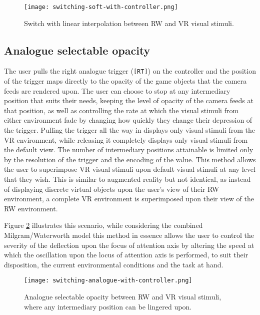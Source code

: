 \begin{figure}[h]
	\begin{center}
		\texttt{[image: switching-soft-with-controller.png]}
		\caption{Switch with linear interpolation between RW and VR visual stimuli.}
		\label{scenario12}
	\end{center}
\end{figure}


\subsection{Analogue selectable opacity}
\label{analogue-selectable-opacity}
The user pulls the right analogue trigger (\texttt{[RT]}) on the controller and the position of the trigger maps directly to the opacity of the game objects that the camera feeds are rendered upon. The user can choose to stop at any intermediary position that suits their needs, keeping the level of opacity of the camera feeds at that position, as well as controlling the rate at which the visual stimuli from either environment fade by changing how quickly they change their depression of the trigger. Pulling the trigger all the way in displays only visual stimuli from the VR environment, while releasing it completely displays only visual stimuli from the default view. The number of intermediary positions attainable is limited only by the resolution of the trigger and the encoding of the value. This method allows the user to superimpose VR visual stimuli upon default visual stimuli at any level that they wish. This is similar to augmented reality but not identical, as instead of displaying discrete virtual objects upon the user's view of their RW environment, a complete VR environment is superimposed upon their view of the RW environment.

Figure \ref{scenario2} illustrates this scenario, while considering the combined Milgram/Waterworth model this method in essence allows the user to control the severity of the deflection upon the focus of attention axis by altering the speed at which the oscillation upon the locus of attention axis is performed, to suit their disposition, the current environmental conditions and the task at hand.

\begin{figure}[h]
	\begin{center}
		\texttt{[image: switching-analogue-with-controller.png]}
		\caption{Analogue selectable opacity between RW and VR visual stimuli, where any intermediary position can be lingered upon.}
		\label{scenario2}
	\end{center}
\end{figure}

